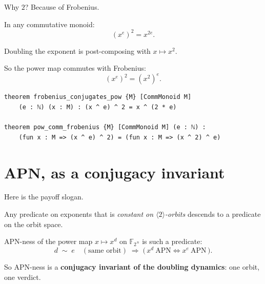 \documentclass[11pt]{article}
\begin{document}
\bigskip

Why $2$? Because of Frobenius.

\bigskip

In any commutative monoid:
\[
  (x^{e})^{2} = x^{2e}.
\]

\bigskip

Doubling the exponent is post-composing with $x \mapsto x^{2}$.

\bigskip

So the power map commutes with Frobenius:
\[
  (x^{e})^{2} = (x^{2})^{e}.
\]

\begin{lstlisting}
theorem frobenius_conjugates_pow {M} [CommMonoid M]
    (e : ℕ) (x : M) : (x ^ e) ^ 2 = x ^ (2 * e)

theorem pow_comm_frobenius {M} [CommMonoid M] (e : ℕ) :
    (fun x : M => (x ^ e) ^ 2) = (fun x : M => (x ^ 2) ^ e)
\end{lstlisting}

\bigskip


\newpage


\section{APN, as a conjugacy invariant}

\bigskip

Here is the payoff slogan.

\bigskip

Any predicate on exponents that is \emph{constant on $\langle 2\rangle$-orbits}
descends to a predicate on the orbit space.

\bigskip

APN-ness of the power map $x \mapsto x^{d}$ on $\mathbb{F}_{2^{\,n}}$ is such a
predicate:
\[
  d \;\sim\; e
  \quad(\text{same orbit})
  \;\Longrightarrow\;
  \bigl(\, x^{d}\ \text{APN} \iff x^{e}\ \text{APN} \,\bigr).
\]

\bigskip

So APN-ness is a \textbf{conjugacy invariant of the doubling dynamics}:
one orbit, one verdict.

\bigskip


\newpage
\end{document}

